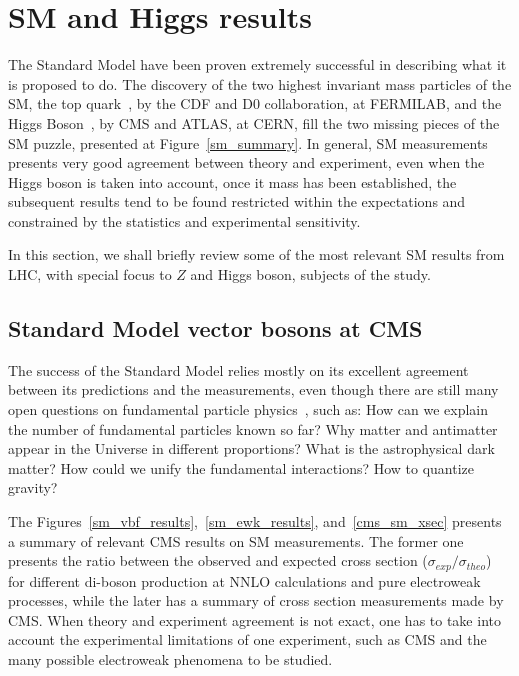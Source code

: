 \section{SM and Higgs results}
\label{section_sm_higgs_results}

The Standard Model have been proven extremely successful in describing what it is proposed to do. The discovery of the two highest invariant mass particles of the SM, the top quark~\cite{top_discovery_cdf,top_discovery_d0}, by the CDF and D0 collaboration, at FERMILAB, and the Higgs Boson~\cite{higgs_discovery_cms,higgs_discovery_atlas}, by CMS and ATLAS, at CERN, fill the two missing pieces of the SM puzzle, presented at Figure~\ref{sm_summary}. In general, SM measurements presents very good agreement between theory and experiment, even when the Higgs boson is taken into account, once it mass has been established, the subsequent results tend to be found restricted within the expectations and constrained by the statistics and experimental sensitivity.  

In this section, we shall briefly review some of the most relevant SM results from LHC, with special focus to $Z$ and Higgs boson, subjects of the study. 

\subsection{Standard Model vector bosons at CMS}
\label{section_sm_vb_results}

The success of the Standard Model relies mostly on its excellent agreement between its predictions and the measurements, even though there are still many open questions on fundamental particle physics~\cite{open_questions}, such as: How can we explain the number of fundamental particles known so far? Why matter and antimatter appear in the Universe in different proportions? What is the astrophysical dark matter? How could we unify the fundamental interactions? How to quantize gravity? 

The Figures~\ref{sm_vbf_results},~\ref{sm_ewk_results}, and~\ref{cms_sm_xsec} presents a summary of relevant CMS results on SM measurements. The former one presents the ratio between the observed and expected cross section ($\sigma_{exp}/\sigma_{theo}$) for different di-boson production at NNLO calculations and pure electroweak processes, while the later has a summary of cross section measurements made by CMS. When theory and experiment agreement is not exact, one has to take into account the experimental limitations of one experiment, such as CMS and the many possible electroweak phenomena to be studied.


